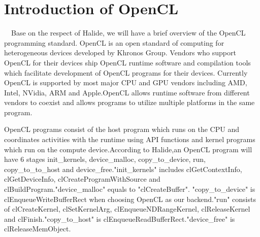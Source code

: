 \section{Introduction of OpenCL}
\quad\  \ Base on the respect of Halide, we will have a brief overview of the OpenCL programming standard. OpenCL is an open standard of computing for heterogeneous devices developed by Khronos Group\cite{OpenCLWeb}. Vendors who support OpenCL for their devices ship OpenCL runtime software and compilation tools which facilitate development of OpenCL programs for their devices. Currently OpenCL is supported by most major CPU and GPU vendors including AMD, Intel, NVidia, ARM and Apple.OpenCL allows runtime software from different vendors to coexist and allows programs to utilize multiple platforms in the same program. 

OpenCL programs consist of the host program which runs on the CPU and coordinates activities with the runtime using API functions and kernel programs which run on the compute device.According to Halide,an OpenCL program will have 6 stages init\_kernels,  device\_malloc, copy\_to\_device, run,  copy\_to\_to\_host and device\_free."init\_kernels" includes clGetContextInfo, clGetDeviceInfo, clCreateProgramWithSource and clBuildProgram."device\_malloc" equals to "clCreateBuffer". "copy\_to\_device" is clEnqueueWriteBufferRect when choosing OpenCL as our backend."run" consists of clCreateKernel, clSetKernelArg, clEnqueueNDRangeKernel, clReleaseKernel and clFinish."copy\_to\_host" is clEnqueueReadBufferRect."device\_free" is clReleaseMemObject.

